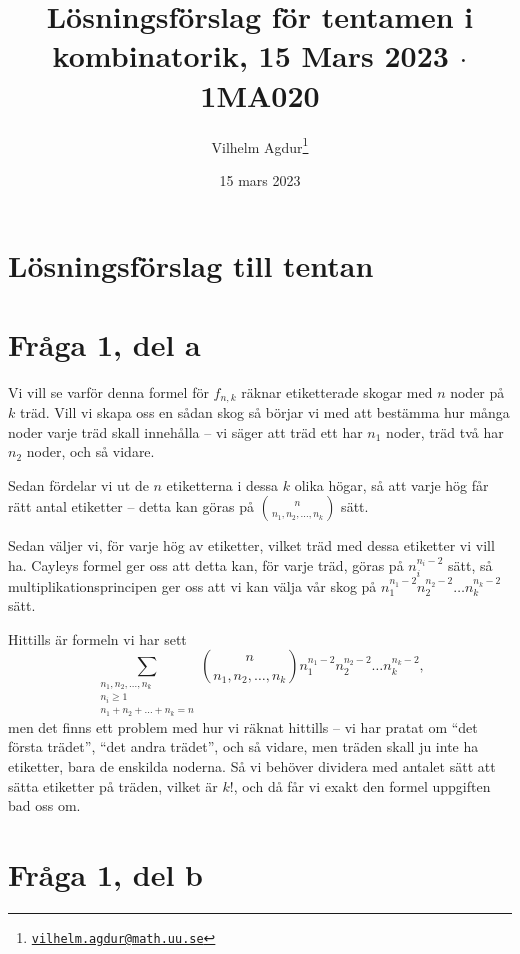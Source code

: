 \documentclass[nobib]{tufte-handout}
\title{Lösningsförslag för tentamen i kombinatorik, 15 Mars 2023 $\cdot$ 1MA020}
\author[Vilhelm Agdur]{Vilhelm Agdur\thanks{\href{mailto:vilhelm.agdur@math.uu.se}{\nolinkurl{vilhelm.agdur@math.uu.se}}}}
\date{15 mars 2023}
\begin{document}

\maketitle%

\begin{abstract}
\noindent

\end{abstract}

\section{Lösningsförslag till tentan}

\section{Fråga 1, del a}

Vi vill se varför denna formel för $f_{n,k}$ räknar etiketterade skogar med $n$ noder på $k$ träd. Vill vi skapa oss en sådan skog så börjar vi med att bestämma hur många noder varje träd skall innehålla -- vi säger att träd ett har $n_1$ noder, träd två har $n_2$ noder, och så vidare.

Sedan fördelar vi ut de $n$ etiketterna i dessa $k$ olika högar, så att varje hög får rätt antal etiketter -- detta kan göras på $\binom{n}{n_1, n_2, \ldots, n_k}$ sätt.

Sedan väljer vi, för varje hög av etiketter, vilket träd med dessa etiketter vi vill ha. Cayleys formel ger oss att detta kan, för varje träd, göras på $n_i^{n_i-2}$ sätt, så multiplikationsprincipen ger oss att vi kan välja vår skog på $n_1^{n_1-2}n_2^{n_2-2}\ldots n_k^{n_k-2}$ sätt.

Hittills är formeln vi har sett
$$\sum_{\substack{n_1, n_2, \ldots, n_k\\ n_i \geq 1\\n_1 + n_2 + \ldots + n_k = n}} \binom{n}{n_1, n_2, \ldots, n_k}n_1^{n_1-2}n_2^{n_2-2}\ldots n_k^{n_k-2},$$
men det finns ett problem med hur vi räknat hittills -- vi har pratat om ``det första trädet'', ``det andra trädet'', och så vidare, men träden skall ju inte ha etiketter, bara de enskilda noderna. Så vi behöver dividera med antalet sätt att sätta etiketter på träden, vilket är $k!$, och då får vi exakt den formel uppgiften bad oss om.

\section{Fråga 1, del b}
\end{document}
